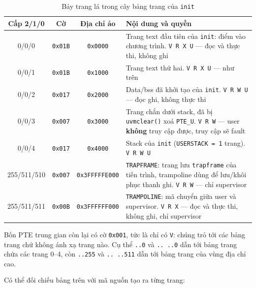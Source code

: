 \begin{table}[H]
    \centering
    \renewcommand{\arraystretch}{1.25}
    \setlength{\tabcolsep}{5pt}
    \begin{tabular}{|c|c|c|l|}
        \hline
        \rowcolor[rgb]{0.8, 0.9, 1.0}
        \textbf{Cấp 2/1/0} & \textbf{Cờ} & \textbf{Địa chỉ ảo} & \textbf{Nội dung và quyền} \\ \hline
        0/0/0 & \texttt{0x01B} & \texttt{0x0000} & Trang text đầu tiên của \texttt{init}: điểm vào chương trình. \texttt{V R X U} --- đọc và thực thi, không ghi \\ \hline
        0/0/1 & \texttt{0x01B} & \texttt{0x1000} & Trang text thứ hai. \texttt{V R X U} --- như trên \\ \hline
        0/0/2 & \texttt{0x017} & \texttt{0x2000} & Data/bss đã khởi tạo của \texttt{init}. \texttt{V R W U} --- đọc ghi, không thực thi \\ \hline
        0/0/3 & \texttt{0x007} & \texttt{0x3000} & Trang chắn dưới stack, đã bị \texttt{uvmclear()} xoá \texttt{PTE\_U}. \texttt{V R W} --- user \textbf{không} truy cập được, truy cập sẽ fault \\ \hline
        0/0/4 & \texttt{0x017} & \texttt{0x4000} & Stack của \texttt{init} (\texttt{USERSTACK = 1} trang). \texttt{V R W U} \\ \hline
        255/511/510 & \texttt{0x007} & \texttt{0x3FFFFFE000} & \texttt{TRAPFRAME}: trang lưu \texttt{trapframe} của tiến trình, trampoline dùng để lưu/khôi phục thanh ghi. \texttt{V R W} --- chỉ supervisor \\ \hline
        255/511/511 & \texttt{0x00B} & \texttt{0x3FFFFFF000} & \texttt{TRAMPOLINE}: mã chuyển giữa user và supervisor. \texttt{V R X} --- đọc và thực thi, không ghi, chỉ supervisor \\ \hline
    \end{tabular}
    \caption{Bảy trang lá trong cây bảng trang của \texttt{init}}
\end{table}

Bốn PTE trung gian còn lại có cờ \texttt{0x001}, tức là chỉ có \texttt{V}: chúng trỏ tới các bảng trang chứ không ánh xạ trang nào. Cụ thể \texttt{..0} và \texttt{.. ..0} dẫn tới bảng trang chứa các trang 0--4, còn \texttt{..255} và \texttt{.. ..511} dẫn tới bảng trang của vùng địa chỉ cao.

Có thể đối chiếu bảng trên với mã nguồn tạo ra từng trang:

